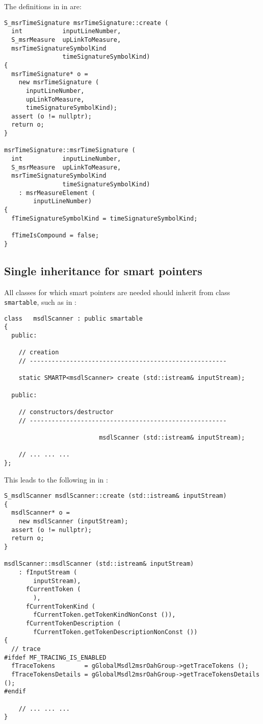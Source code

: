 The definitions in in  are:
\begin{lstlisting}[language=CPlusPlus]
S_msrTimeSignature msrTimeSignature::create (
  int           inputLineNumber,
  S_msrMeasure  upLinkToMeasure,
  msrTimeSignatureSymbolKind
                timeSignatureSymbolKind)
{
  msrTimeSignature* o =
    new msrTimeSignature (
      inputLineNumber,
      upLinkToMeasure,
      timeSignatureSymbolKind);
  assert (o != nullptr);
  return o;
}

msrTimeSignature::msrTimeSignature (
  int           inputLineNumber,
  S_msrMeasure  upLinkToMeasure,
  msrTimeSignatureSymbolKind
                timeSignatureSymbolKind)
    : msrMeasureElement (
        inputLineNumber)
{
  fTimeSignatureSymbolKind = timeSignatureSymbolKind;

  fTimeIsCompound = false;
}
\end{lstlisting}


\subsection{Single inheritance for smart pointers}

All classes for which smart pointers are needed should inherit from class   {\tt smartable}, such as in :
\begin{lstlisting}[language=CPlusPlus]
class   msdlScanner : public smartable
{
  public:

    // creation
    // ------------------------------------------------------

    static SMARTP<msdlScanner> create (std::istream& inputStream);

  public:

    // constructors/destructor
    // ------------------------------------------------------

                          msdlScanner (std::istream& inputStream);

	// ... ... ...
};
\end{lstlisting}

This leads to the following in in :
\begin{lstlisting}[language=CPlusPlus]
S_msdlScanner msdlScanner::create (std::istream& inputStream)
{
  msdlScanner* o =
    new msdlScanner (inputStream);
  assert (o != nullptr);
  return o;
}

msdlScanner::msdlScanner (std::istream& inputStream)
    : fInputStream (
        inputStream),
      fCurrentToken (
        ),
      fCurrentTokenKind (
        fCurrentToken.getTokenKindNonConst ()),
      fCurrentTokenDescription (
        fCurrentToken.getTokenDescriptionNonConst ())
{
  // trace
#ifdef MF_TRACING_IS_ENABLED
  fTraceTokens        = gGlobalMsdl2msrOahGroup->getTraceTokens ();
  fTraceTokensDetails = gGlobalMsdl2msrOahGroup->getTraceTokensDetails ();
#endif

	// ... ... ...
}
\end{lstlisting}


